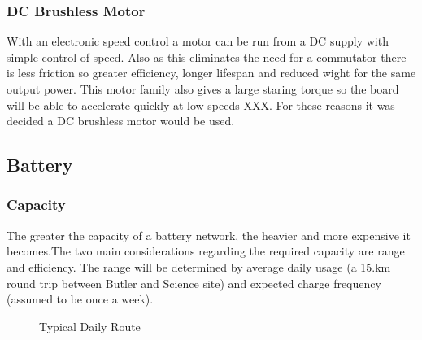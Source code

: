 \documentclass[journal,10pt]{IEEEtran}
\begin{document}
        \subsubsection{DC Brushless Motor}
            With an electronic speed control a motor can be run from a DC supply with simple control of speed. Also as this eliminates the need for a commutator there is less friction so greater efficiency, longer lifespan and reduced wight for the same output power. This motor family also gives a large staring torque so the board will be able to accelerate quickly at low speeds XXX. For these reasons it was decided a DC brushless motor would be used.
    \subsection{Battery}
        \subsubsection{Capacity}
            The greater the capacity of a battery network, the heavier and more expensive it becomes.The two main considerations regarding the required capacity are range and efficiency. The range will be determined by average daily usage (a 15.km round trip between Butler and Science site) and expected charge frequency (assumed to be once a week).
            \begin{figure}[H]
                \centering
                \caption{Typical Daily Route}
                \label{fig:route}
            \end{figure}
\end{document}
